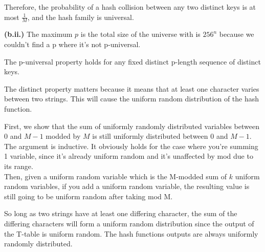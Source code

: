 \documentclass[11pt]{article}
\renewcommand{\part}[1] {\vspace{.10in} {\bf (#1)}}
\begin{document}
Therefore, the probability of a hash collision between any two distinct keys is at most $\frac{1}{M}$, and the hash family is universal.

\part{b.ii.}
The maximum $p$ is the total size of the universe with is $256^n$ because we couldn't find a p where it's not p-universal.

The p-universal property holds for any fixed distinct p-length sequence of distinct keys.

The distinct property matters because it means that at least one character varies between two strings. This will cause the uniform random distribution of the hash function.

First, we show that the sum of uniformly randomly distributed variables between 0 and $M-1$ modded by $M$ is still uniformly distributed between 0 and $M-1$.\\
The argument is inductive. It obviously holds for the case where you're summing 1 variable, since it's already uniform random and it's unaffected by mod due to its range.\\
Then, given a uniform random variable which is the M-modded sum of $k$ uniform random variables, if you add a uniform random variable, the resulting value is still going to be uniform random after taking mod M.

So long as two strings have at least one differing character, the sum of the differing characters will form a uniform random distribution since the output of the T-table is uniform random.
The hash functions outputs are always uniformly randomly distributed.
\end{document}
